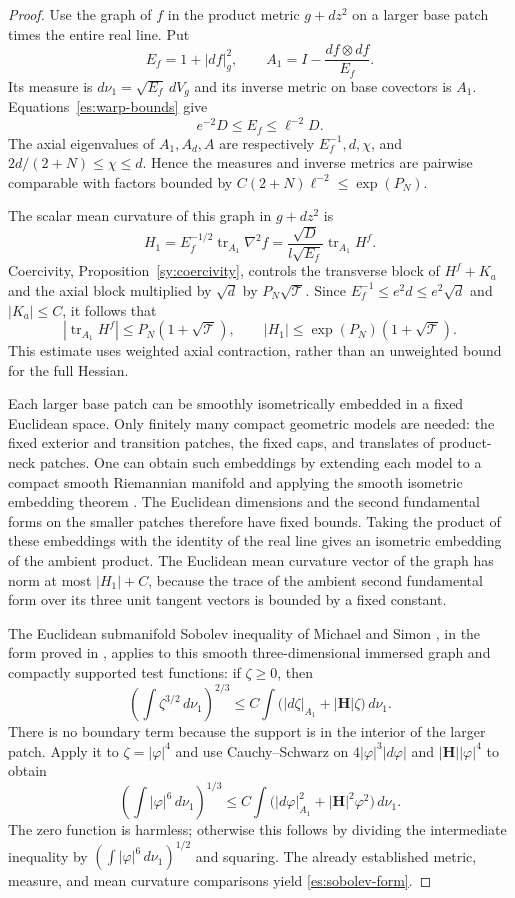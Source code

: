 \begin{proof}
Use the graph of $f$ in the product metric $g+dz^2$ on a larger base
patch times the entire real line.  Put
\[
 E_f=1+|df|_g^2,\qquad
 A_1=I-\frac{df\otimes df}{E_f}.
\]
Its measure is $d\nu_1=\sqrt{E_f}\,dV_g$ and its inverse metric on
base covectors is $A_1$.  Equations~\eqref{es:warp-bounds} give
\[
 e^{-2}D\le E_f\le\ell^{-2}D.
\]
The axial eigenvalues of $A_1,A_d,A$ are respectively
$E_f^{-1},d,\chi$, and
$2d/(2+N)\le\chi\le d$.  Hence the measures and inverse metrics
are pairwise comparable with factors bounded by
$C(2+N)\ell^{-2}\le\exp(P_N)$.

The scalar mean curvature of this graph in $g+dz^2$ is
\[
 H_1=E_f^{-1/2}\operatorname{tr}_{A_1}\nabla^2f
    =\frac{\sqrt D}{l\sqrt{E_f}}
           \operatorname{tr}_{A_1}H^f.
\]
Coercivity, Proposition~\ref{sy:coercivity}, controls the transverse block
of $H^f+K_a$ and the axial block multiplied by $\sqrt d$ by
$P_N\sqrt{\mathcal T}$.  Since
$E_f^{-1}\le e^2d\le e^2\sqrt d$ and $|K_a|\le C$, it follows that
\[
 |\operatorname{tr}_{A_1}H^f|
       \le P_N(1+\sqrt{\mathcal T}),\qquad
 |H_1|\le\exp(P_N)(1+\sqrt{\mathcal T}).
\]
This estimate uses weighted axial contraction, rather than an
unweighted bound for the full Hessian.

Each larger base patch can be smoothly isometrically embedded in a
fixed Euclidean space.  Only finitely many compact geometric models
are needed: the fixed exterior and transition patches, the fixed
caps, and translates of product-neck patches.  One can obtain such
embeddings by extending each model to a compact smooth Riemannian
manifold and applying the smooth isometric embedding theorem
\cite[Theorem~2, p.~59]{Nash1956}.
The Euclidean dimensions and the second fundamental forms on the
smaller patches therefore have fixed bounds.  Taking the product
of these embeddings with the identity of the real line gives an
isometric embedding of the ambient product.  The Euclidean mean
curvature vector of the graph has norm at most $|H_1|+C$, because
the trace of the ambient second fundamental form over its three
unit tangent vectors is bounded by a fixed constant.

The Euclidean submanifold Sobolev inequality of Michael and Simon
\cite{MichaelSimon1973}, in the form proved in
\cite[Chapter~4, Section~6, Theorem~6.7]{Simon2018GMT},
applies to this smooth three-dimensional immersed graph and compactly
supported test functions: if $\zeta\ge0$, then
\[
 \left(\int\zeta^{3/2}\,d\nu_1\right)^{2/3}
 \le C\int\bigl(|d\zeta|_{A_1}+|\mathbf H|\zeta\bigr)\,d\nu_1.
\]
There is no boundary term because the support is in the interior of
the larger patch.  Apply it to $\zeta=|\varphi|^4$ and use
Cauchy--Schwarz on
$4|\varphi|^3|d\varphi|$ and
$|\mathbf H||\varphi|^4$ to obtain
\[
 \left(\int|\varphi|^6\,d\nu_1\right)^{1/3}
 \le C\int\bigl(|d\varphi|_{A_1}^2+
                          |\mathbf H|^2\varphi^2\bigr)\,d\nu_1.
\]
The zero function is harmless; otherwise this follows by dividing
the intermediate inequality by
$(\int|\varphi|^6\,d\nu_1)^{1/2}$ and squaring.
The already established metric, measure, and mean curvature
comparisons yield \eqref{es:sobolev-form}.
\end{proof}

